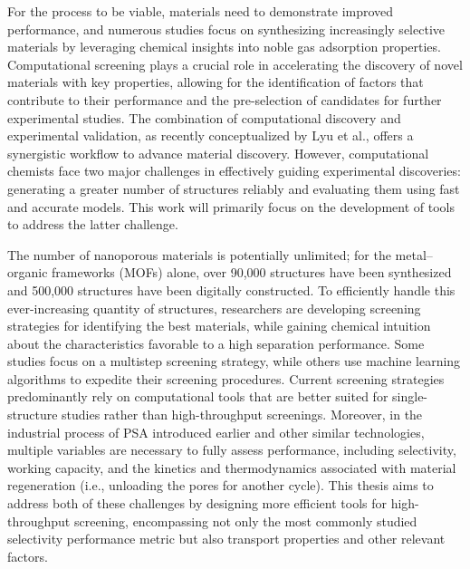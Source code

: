 For the process to be viable, materials need to demonstrate improved performance, and numerous studies focus on synthesizing increasingly selective materials by leveraging chemical insights into noble gas adsorption properties.\autocite{Chen_2014, Li_2019, Pei_2022} Computational screening plays a crucial role in accelerating the discovery of novel materials with key properties, allowing for the identification of factors that contribute to their performance and the pre-selection of candidates for further experimental studies. The combination of computational discovery and experimental validation, as recently conceptualized by Lyu et al., offers a synergistic workflow to advance material discovery.\autocite{Lyu_2020, Jablonka_2022} However, computational chemists face two major challenges in effectively guiding experimental discoveries: generating a greater number of structures reliably and evaluating them using fast and accurate models. This work will primarily focus on the development of tools to address the latter challenge.

The number of nanoporous materials is potentially unlimited; for the metal--organic frameworks (MOFs) alone, over 90,000 structures have been synthesized\autocite{Groom_2016} and 500,000 structures have been digitally constructed\autocite{Wilmer_2012,Boyd_2016,Colon_2017}. To efficiently handle this ever-increasing quantity of structures, researchers are developing screening strategies for identifying the best materials, while gaining chemical intuition about the characteristics favorable to a high separation performance. Some studies focus on a multistep screening strategy,\autocite{Wilmer_2012,Qiao_2016,Yang_2020} while others use machine learning algorithms to expedite their screening procedures.\autocite{Fernandez_2013,Simon_2015,Rosen_2021} Current screening strategies predominantly rely on computational tools that are better suited for single-structure studies rather than high-throughput screenings. Moreover, in the industrial process of PSA introduced earlier and other similar technologies, multiple variables are necessary to fully assess performance, including selectivity, working capacity, and the kinetics and thermodynamics associated with material regeneration (i.e., unloading the pores for another cycle).\autocite{Kumar_1994} This thesis aims to address both of these challenges by designing more efficient tools for high-throughput screening, encompassing not only the most commonly studied selectivity performance metric but also transport properties and other relevant factors. 


